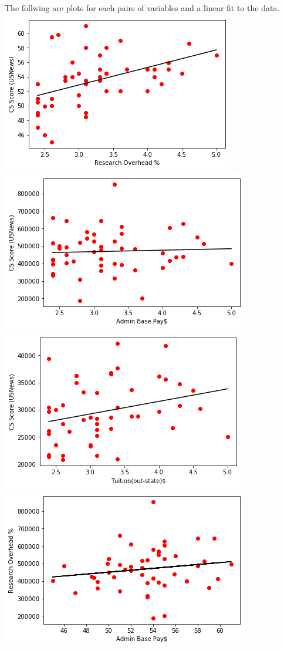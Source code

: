 \documentclass[a4paper,11pt]{article}
\begin{document}
{The follwing are plots for each pairs of variables and a linear fit to the data.\\
\includegraphics{0,1}\\
\includegraphics{0,2}\\
\includegraphics{0,3}\\
\includegraphics{1,2}\\
}
\end{document}
